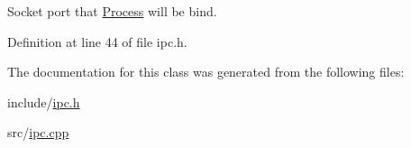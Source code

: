 Socket port that \hyperlink{classdistributed__system_1_1Process}{Process} will be bind. 



Definition at line 44 of file ipc.\+h.



The documentation for this class was generated from the following files\+:\begin{DoxyCompactItemize}
\item 
include/\hyperlink{ipc_8h}{ipc.\+h}\item 
src/\hyperlink{ipc_8cpp}{ipc.\+cpp}\end{DoxyCompactItemize}
